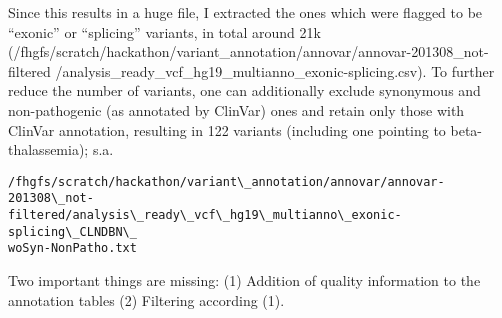 \documentclass[a4paper,11pt]{TKnotes}
\begin{document}
Since this results in a huge file, I extracted the ones which were flagged to be ``exonic'' or ``splicing'' variants, in total around 21k (/fhgfs/scratch/hackathon/variant\_annotation/annovar/annovar-201308\_not-filtered /analysis\_ready\_vcf\_hg19\_multianno\_exonic-splicing.csv). To further reduce the number of variants, one can additionally exclude synonymous and non-pathogenic (as annotated by ClinVar) ones and retain only those with ClinVar annotation, resulting in 122 variants (including one pointing to beta-thalassemia); s.a.
\begin{verbatim}
/fhgfs/scratch/hackathon/variant\_annotation/annovar/annovar-201308\_not-
filtered/analysis\_ready\_vcf\_hg19\_multianno\_exonic-splicing\_CLNDBN\_
woSyn-NonPatho.txt
\end{verbatim}
 
Two important things are missing: (1) Addition of quality information to the annotation tables (2) Filtering according (1).

%
%
\end{document}
